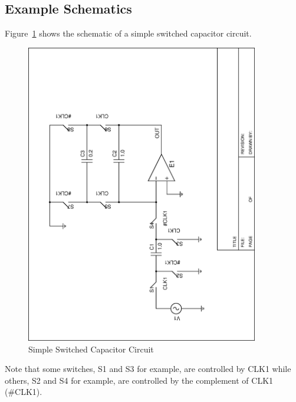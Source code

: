 \documentclass{article}
\begin{document}
\subsection{Example Schematics}
Figure~\ref{fig:ckt} shows the
schematic of a simple switched capacitor circuit.
\begin{figure}
\begin{center}
\includegraphics[angle=270,width=4in]{ckt.eps}
\end{center}
\caption{Simple Switched Capacitor Circuit}
\label{fig:ckt}
\end{figure}
Note that some switches, S1 and S3 for example, are controlled by CLK1
while others, S2 and S4 for example, are controlled by the complement
of CLK1 (\#CLK1).  
\end{document}
